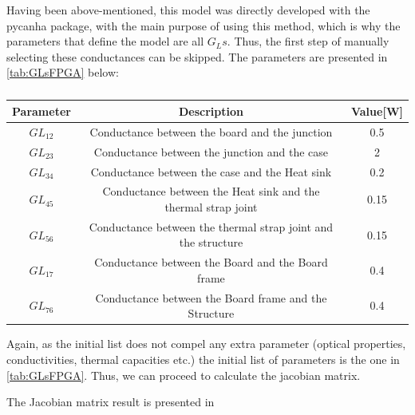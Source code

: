 Having been above-mentioned, this model was directly developed with the pycanha package, with the main purpose of using this method, which is why the parameters that define the model are all $G_Ls$. Thus, the first step of manually selecting these conductances can be skipped. The parameters are presented in \autoref{tab:GLsFPGA} below:

\begin{table}[H]
\centering
\caption{}
\label{tab:GLsFPGA}

\begin{tabular}{c c c}
\toprule
\multicolumn{1}{c}{\textbf{Parameter}} & \multicolumn{1}{c}{\textbf{Description}} & \multicolumn{1}{c}{\textbf{Value}[W]} \\ \midrule
$GL_{12}$  & Conductance between the board and the junction  & 0.5 \\ 
$GL_{23}$  & Conductance between the junction and the case  &  2\\ 
$GL_{34}$  & Conductance between the case and the Heat sink  & 0.2 \\ 
$GL_{45}$  & Conductance between the Heat sink and the thermal strap joint  & 0.15 \\ 
$GL_{56}$  & Conductance between the thermal strap joint and the structure  & 0.15 \\ 
$GL_{17}$  & Conductance between the Board and the Board frame  & 0.4 \\ 
$GL_{76}$  & Conductance between the Board frame and the Structure  & 0.4 \\ \bottomrule
\end{tabular}
\end{table}

Again, as the initial list does not compel any extra parameter (optical properties, conductivities, thermal capacities etc.) the initial list of parameters is the one in \autoref{tab:GLsFPGA}. Thus, we can proceed to calculate the jacobian matrix.

The Jacobian matrix result is presented in 

